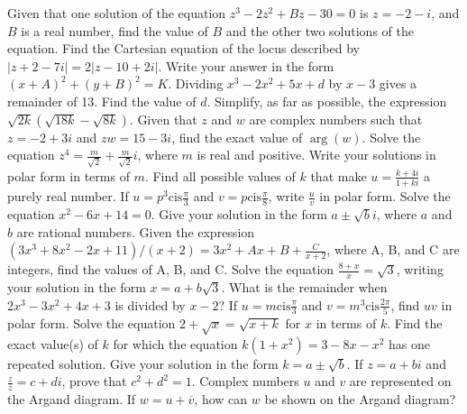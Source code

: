 \documentclass[12pt,addpoints]{exam}
\begin{document}
\begin{questions}
\fillwithlines{5cm}
\question[5] Given that one solution of the equation \( z^3 - 2z^2 + Bz - 30 = 0 \) is \( z = -2 - i \), and \( B \) is a real number, find the value of \( B \) and the other two solutions of the equation.
\fillwithlines{5cm}
\question[5] Find the Cartesian equation of the locus described by \( |z + 2 - 7i| = 2|z - 10 + 2i| \). Write your answer in the form \( (x + A)^2 + (y + B)^2 = K \).
\fillwithlines{5cm}
\question[5] Dividing \(x^3 - 2x^2 + 5x + d\) by \(x - 3\) gives a remainder of 13. Find the value of \(d\).
\fillwithlines{5cm}
\question[5] Simplify, as far as possible, the expression \(\sqrt{2k} \left( \sqrt{18k} - \sqrt{8k} \right)\).
\fillwithlines{5cm}
\question[5] Given that \(z\) and \(w\) are complex numbers such that \(z = -2 + 3i\) and \(zw = 15 - 3i\), find the exact value of \(\arg(w)\).
\fillwithlines{5cm}
\question[5] Solve the equation \( z^4 = \frac{m}{\sqrt{2}} + \frac{m}{\sqrt{2}} i \), where \( m \) is real and positive. Write your solutions in polar form in terms of \( m \).
\fillwithlines{5cm}
\question[5] Find all possible values of \( k \) that make \( u = \frac{k + 4i}{1 + ki} \) a purely real number.
\fillwithlines{5cm}
\question[5] If \( u = p^{3} \text{cis} \frac{\pi}{3} \) and \( v = p \text{cis} \frac{\pi}{8} \), write \( \frac{u}{v} \) in polar form.
\fillwithlines{5cm}
\question[5] Solve the equation \( x^2 - 6x + 14 = 0 \). Give your solution in the form \( a \pm \sqrt{b}i \), where \( a \) and \( b \) are rational numbers.
\fillwithlines{5cm}
\question[5] Given the expression \((3x^3 + 8x^2 - 2x + 11) / (x + 2) = 3x^2 + Ax + B + \frac{C}{x + 2}\), where A, B, and C are integers, find the values of A, B, and C.
\fillwithlines{5cm}
\question[5] Solve the equation \(\frac{8 + x}{x} = \sqrt{3}\), writing your solution in the form \(x = a + b\sqrt{3}\).
\fillwithlines{5cm}
\question[5] What is the remainder when \(2x^3 - 3x^2 + 4x + 3\) is divided by \(x - 2\)?
\fillwithlines{5cm}
\question[5] If \( u = m \text{cis} \frac{\pi}{3} \) and \( v = m^3 \text{cis} \frac{2\pi}{5} \), find \( uv \) in polar form.
\fillwithlines{5cm}
\question[5] Solve the equation \(2 + \sqrt{x} = \sqrt{x + k}\) for \(x\) in terms of \(k\).
\fillwithlines{5cm}
\question[5] Find the exact value(s) of \( k \) for which the equation \( k(1 + x^2) = 3 - 8x - x^2 \) has one repeated solution. Give your solution in the form \( k = a \pm \sqrt{b} \).
\fillwithlines{5cm}
\question[5] If \( z = a + bi \) and \( \frac{z}{\overline{z}} = c + di \), prove that \( c^2 + d^2 = 1 \).
\fillwithlines{5cm}
\question[5] Complex numbers \( u \) and \( v \) are represented on the Argand diagram. If \( w = u + \overline{v} \), how can \( w \) be shown on the Argand diagram?

\end{questions}
\end{document}
